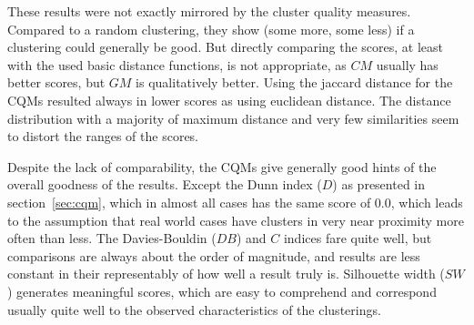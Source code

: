 These results were not exactly mirrored by the cluster quality measures. Compared to a random clustering, they show (some more, some less) if a clustering could generally be good. But directly comparing the scores, at least with the used basic distance functions, is not appropriate, as $CM$ usually has better scores, but $GM$ is qualitatively better. Using the jaccard distance for the CQMs resulted always in lower scores as using euclidean distance. The distance distribution with a majority of maximum distance and very few similarities seem to distort the ranges of the scores.

Despite the lack of comparability, the CQMs give generally good hints of the overall goodness of the results. Except the Dunn index ($D$) as presented in section~\ref{sec:cqm}, which in almost all cases has the same score of $0.0$, which leads to the assumption that real world cases have clusters in very near proximity more often than less. The Davies-Bouldin ($DB$) and $C$ indices fare quite well, but comparisons are always about the order of magnitude, and results are less constant in their representably of how well a result truly is. Silhouette width ($SW$) generates meaningful scores, which are easy to comprehend and correspond usually quite well to the observed characteristics of the clusterings.